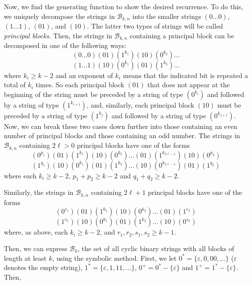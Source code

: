 \documentclass[12pt]{article}
\begin{document}
Now, we find the generating function to show the desired recurrence.  To do this, we uniquely decompose the strings in $\mathscr{B}_{k,n}$ into the smaller strings $(0\dots0)$, $(1\dots1)$, $(01)$, and $(10)$. The latter two types of strings will be called \emph{principal blocks}. Then, the strings in $\mathscr{B}_{k,n}$ containing a principal block can be decomposed in one of the following ways:
$$(0\dots0)(01)(1^{k_1})(10)(0^{k_2})\dots$$
$$(1\dots1)(10)(0^{k_1})(01)(1^{k_2})\dots$$
where $k_i\geq k-2$ and an exponent of $k_i$ means that the indicated bit is repeated a total of $k_i$ times. So each principal block $(01)$ that does not appear at the beginning of the string must be preceded by a string of type $(0^{k_i})$ and followed by a string of type $(1^{k_{i+1}})$, and, similarly, each principal block $(10)$ must be preceded by a string of type $(1^{k_j})$ and followed by a string of type $(0^{k_{j+1}})$. 
Now, we can break these two cases down further into those containing an even number of principal blocks and those containing an odd number. The strings in $\mathscr{B}_{k,n}$ containing $2\ell>0$ principal blocks have one of the forms
$$(0^{p_1})(01)(1^{k_1})(10)(0^{k_2})\dots(01)(1^{k_{2\ell-1}})(10)(0^{p_2})$$
$$(1^{q_1})(10)(0^{k_1})(01)(1^{k_2})\dots(10)(0^{k_{2\ell-1}})(01)(1^{q_2})$$
where each $k_i \geq k-2$, $p_1+p_2 \geq k-2$ and $q_1+q_2 \geq k-2$. 

Similarly, the strings in $\mathscr{B}_{k,n}$ containing $2\ell+1$ principal blocks have one of the forms 
$$(0^{r_1})(01)(1^{k_1})(10)(0^{k_2})\dots(01)(1^{r_2})$$
$$(1^{s_1})(10)(0^{k_1})(01)(1^{k_2})\dots(10)(0^{s_2})$$ 
where, as above, each $k_i \geq k-2$, and $r_1,r_2,s_1,s_2 \geq k-1$.

Then, we can express $\mathscr{B}_k$, the set of all cyclic binary strings with all blocks of length at least $k$, using the symbolic method. First, we let $0^*=\{\varepsilon, 0, 00, \dots\}$ ($\varepsilon$ denotes the empty string), $1^*=\{\varepsilon, 1, 11, \dots\}$, $0^+=0^* - \{\varepsilon\}$ and $1^+=1^* - \{\varepsilon\}$. Then, 
\end{document}
